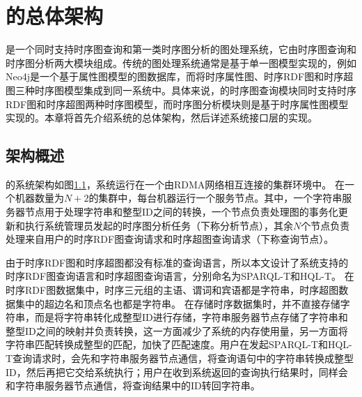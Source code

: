\chapter{\sys 的总体架构}
\sys 是一个同时支持时序图查询和第一类时序图分析的图处理系统，它由时序图查询和时序图分析两大模块组成。传统的图处理系统通常是基于单一图模型实现的，例如Neo4j是一个基于属性图模型的图数据库，而\sys 将时序属性图、时序RDF图和时序超图三种时序图模型集成到同一系统中。具体来说，\sys 的时序图查询模块同时支持时序RDF图和时序超图两种时序图模型，而时序图分析模块则是基于时序属性图模型实现的。本章将首先介绍系统的总体架构，然后详述系统接口层的实现。

\section{架构概述}
\label{sec:arch}
\sys 的系统架构如图\ref{arch}，系统运行在一个由RDMA网络相互连接的集群环境中。
在一个机器数量为$N+2$的集群中，每台机器运行一个服务节点。其中，一个字符串服务器节点用于处理字符串和整型ID之间的转换，一个节点负责处理图的事务化更新和执行系统管理员发起的时序图分析任务（下称分析节点），其余$N$个节点负责处理来自用户的时序RDF图查询请求和时序超图查询请求（下称查询节点）。

\begin{figure}[htb]
\label{arch}
\end{figure}

由于时序RDF图和时序超图都没有标准的查询语言，所以本文设计了系统支持的时序RDF图查询语言和时序超图查询语言，分别命名为SPARQL-T和HQL-T。
在时序RDF图数据集中，时序三元组的主语、谓词和宾语都是字符串，时序超图数据集中的超边名和顶点名也都是字符串。
\sys 在存储时序数据集时，并不直接存储字符串，而是将字符串转化成整型ID进行存储，字符串服务器节点存储了字符串和整型ID之间的映射并负责转换，这一方面减少了系统的内存使用量，另一方面将字符串匹配转换成整型的匹配，加快了匹配速度。用户在发起SPARQL-T和HQL-T查询请求时，会先和字符串服务器节点通信，将查询语句中的字符串转换成整型ID，然后再把它交给系统执行；用户在收到系统返回的查询执行结果时，同样会和字符串服务器节点通信，将查询结果中的ID转回字符串。

